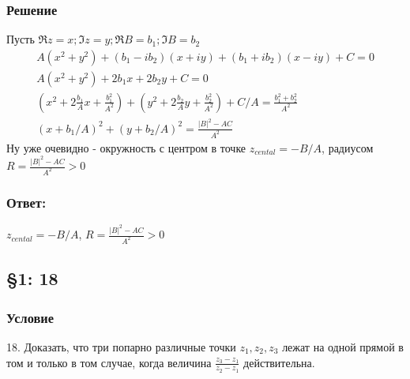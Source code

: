 \documentclass{article}
\begin{document}
\subsubsection*{Решение}   
Пусть $\Re{z}=x; \Im{z}=y ; \Re{B}=b_1 ; \Im{B} = b_2$
\begin{gather*}
    A(x^2+y^2)+ (b_1- i b_2)(x+ iy)+(b_1+i b_2)(x-iy)+C=0\\
    A(x^2+y^2) + 2b_1 x+2b_2y+C=0\\
    (x^2+2 \frac{b_1}{A} x + \frac{b_1^2}{A^2})+ (y^2+2 \frac{b_2}{A} y + \frac{b_2^2}{A^2}) + C/A = \frac{b_1^2+b_2^2}{A^2}\\
    (x+b_1/A)^2+(y+b_2/A)^2 = \frac{|B|^2-AC}{A^2}
\end{gather*}
Ну уже очевидно - окружность с центром в точке $z_{cental}=-B/A$, радиусом $R=\frac{|B|^2-AC}{A^2}>0$
\subsubsection*{Ответ:}
 $z_{cental}=-B/A$, $R=\frac{|B|^2-AC}{A^2}>0$

\subsection{\S1: 18}
\subsubsection*{Условие}
18. Доказать, что три попарно различные точки $z_{1}, z_{2}, z_{3}$ лежат на одной прямой в том и только в том случае, когда величина $\frac{z_{3}-z_{1}}{z_{2}-z_{1}}$ действительна.
\end{document}
